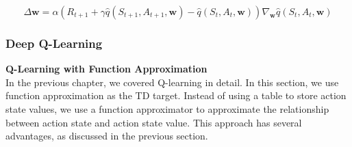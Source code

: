 \documentclass{article}
\begin{document}
\begin{equation}
\Delta \mathbf{w}=\alpha\left(R_{t+1}+\gamma \hat{q}\left(S_{t+1}, A_{t+1}, \mathbf{w}\right)-\hat{q}\left(S_t, A_t, \mathbf{w}\right)\right) \nabla_{\mathbf{w}} \hat{q}\left(S_t, A_t, \mathbf{w}\right)
\end{equation}



\begin{comment}
\begin{algorithm}
  \caption{Q-learning with function approximation (on-policy version)}\label{alg:policy_search}
  \begin{algorithmic}
    \State  Initial parameter vector $w_0$, Initial policy $\pi_0$, Small $\epsilon > 0$.
    \State  Search a good policy that can lead the agent to the target from an initial state-action pair $(s_0, a_0)$.
    \For{each episode}
        \State Take action $a_t$ following $\pi_t(s_t)$, and generate $r_{t+1}$, $s_{t+1}$
        \State \textbf{Value update (parameter update):}
        \State $w_{t+1}=w_t+\alpha_t[r_{t+1}+\gamma \max _{a \in \mathcal{A}(s_{t+1})} \hat{q}(s_{t+1}, a, w_t)- $
        \State  $\hat{q}(s_t, a_t, w_t)] \nabla_w \hat{q}(s_t, a_t, w_t)$
        \State \textbf{Policy update:}
        \State $\pi_{t+1}(a \mid s_t)=1-\frac{\varepsilon}{|\mathcal{A}(s)|}(|\mathcal{A}(s)|-1) \text { if } a= \arg \max _{a \in \mathcal{A}(s_t)} \hat{q}(s_t, a, w_{t+1}) $
        \State $\pi_{t+1}(a \mid s_t)=\frac{\varepsilon}{|\mathcal{A}(s)|} \text { otherwise }$
    \EndFor
  \end{algorithmic}
\end{algorithm}
\end{comment}

\newpage
\subsubsection{Deep Q-Learning}

\noindent
\textbf{Q-Learning with Function Approximation}\\
\noindent
In the previous chapter, we covered Q-learning in detail. In this section, we use function approximation as the TD target. Instead of using a table to store action state values, we use a function approximator to approximate the relationship between action state and action state value. This approach has several advantages, as discussed in the previous section.
\end{document}
